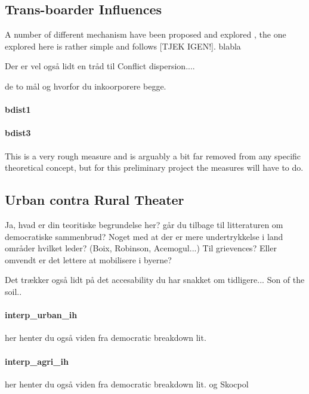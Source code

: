 \documentclass[a4paper]{article}
\begin{document}


\subsection{Trans-boarder Influences} %

A number of different mechanism have been proposed and explored \citep[29-30]{Blattman_Miguel_2010}, the one explored here is rather simple and follows \cite{Hegre_Sambanis_2006} [TJEK IGEN!]. blabla

Der er vel også lidt en tråd til Conflict dispersion....

de to mål og hvorfor du inkoorporere begge.

\paragraph{bdist1}  
\paragraph{bdist3}


This is a very rough measure and is arguably a bit far removed from any specific theoretical concept, but for this preliminary project the measures will have to do.

\subsection{Urban contra Rural Theater} %

Ja, hvad er din teoritiske begrundelse her? går du tilbage til litteraturen om democratiske sammenbrud? Noget med at der er mere undertrykkelse i land områder hvilket leder? (Boix, Robinson, Acemogul...) Til grievences? Eller omvendt er det lettere at mobilisere i byerne?

Det trækker også lidt på det accesability du har snakket om tidligere... Son of the soil..

\paragraph{interp\_urban\_ih} her henter du også viden fra democratic breakdown lit.  
\paragraph{interp\_agri\_ih}  her henter du også viden fra democratic breakdown lit.  og Skocpol
\end{document}

